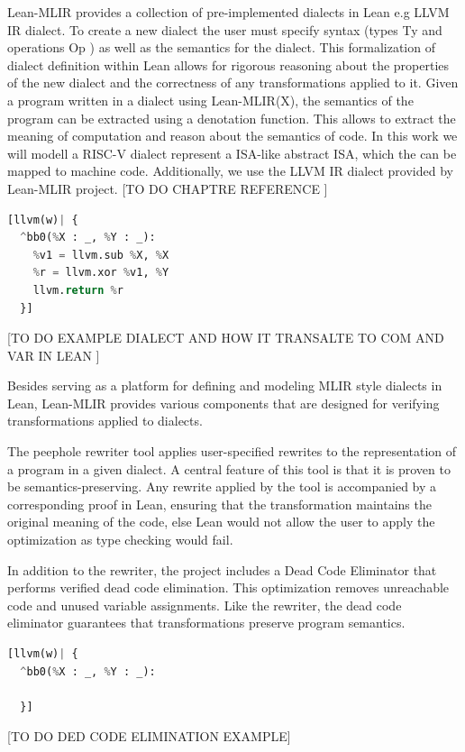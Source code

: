 Lean-MLIR provides a collection of pre-implemented dialects in Lean e.g LLVM IR dialect. To create a new dialect the user must specify syntax (types Ty and operations Op ) as well as the semantics for the dialect. This formalization of dialect definition within Lean allows for rigorous reasoning about the properties of the new dialect and the correctness of any transformations applied to it. Given a program written in a dialect using Lean-MLIR(X), the semantics of the program can be extracted using a denotation function. This allows to extract the meaning of computation and reason about the semantics of code. In this work we will modell a RISC-V dialect represent a ISA-like abstract ISA, which the can be mapped to machine code. Additionally, we use the LLVM IR dialect provided by Lean-MLIR project. [TO DO CHAPTRE REFERENCE ]
\begin{lstlisting}[language=Python, caption=LLVM IR dialect program in Lean based on the Lean-MLIR(X) framework]
 [llvm(w)| {
  ^bb0(%X : _, %Y : _):
    %v1 = llvm.sub %X, %X
    %r = llvm.xor %v1, %Y
    llvm.return %r
  }]
\end{lstlisting}
[TO DO EXAMPLE DIALECT AND HOW IT TRANSALTE TO COM AND VAR IN LEAN ]

Besides serving as a platform for defining and modeling MLIR style dialects in Lean, Lean-MLIR provides various components that are designed for verifying transformations applied to dialects.

The peephole rewriter tool applies user-specified rewrites to the representation of a program in a given dialect. A central feature of this tool is that it is proven to be semantics-preserving. Any rewrite applied by the tool is accompanied by a corresponding proof in Lean, ensuring that the transformation maintains the original meaning of the code, else Lean would not allow the user to apply the optimization as type checking would fail. 

In addition to the rewriter, the project includes a Dead Code Eliminator that performs verified dead code elimination. This optimization removes unreachable code and unused variable assignments. Like the rewriter, the dead code eliminator guarantees that transformations preserve program semantics. 
\begin{lstlisting}[language=Python, caption= DCE example]
 [llvm(w)| {
  ^bb0(%X : _, %Y : _):

  }]
\end{lstlisting}[TO DO DED CODE ELIMINATION EXAMPLE]

